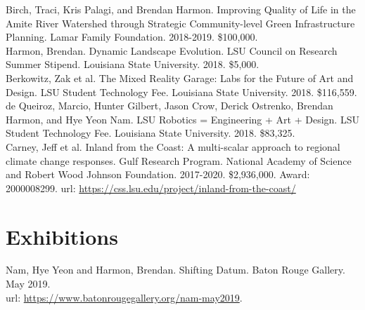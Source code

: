 \documentclass[]{baharmon_cv}
\begin{document}
Birch, Traci, Kris Palagi, and Brendan Harmon. Improving Quality of Life in the Amite River Watershed through Strategic Community-level Green Infrastructure Planning. Lamar Family Foundation. 2018-2019. \$100,000.\\

Harmon, Brendan. Dynamic Landscape Evolution. LSU Council on Research Summer Stipend. Louisiana State University. 2018. \$5,000.\\

Berkowitz, Zak et al. The Mixed Reality Garage: Labs for the Future of Art and Design. LSU Student Technology Fee. Louisiana State University. 2018. \$116,559.\\

de Queiroz, Marcio, Hunter Gilbert, Jason Crow, Derick Ostrenko, Brendan Harmon, and Hye Yeon Nam. LSU Robotics = Engineering + Art + Design. LSU Student Technology Fee. Louisiana State University. 2018. \$83,325.\\


Carney, Jeff et al. Inland from the Coast: A multi-scalar approach to regional climate change responses. Gulf Research Program. National Academy of Science and Robert Wood Johnson Foundation. 2017-2020. \$2,936,000. Award: 2000008299.
url: \url{https://css.lsu.edu/project/inland-from-the-coast/}\\


\sectiondivider \linebreak


\section{Exhibitions} 

Nam, Hye Yeon and Harmon, Brendan. Shifting Datum. Baton Rouge Gallery. May 2019.\\
url: \url{https://www.batonrougegallery.org/nam-may2019}.\\
\end{document}
